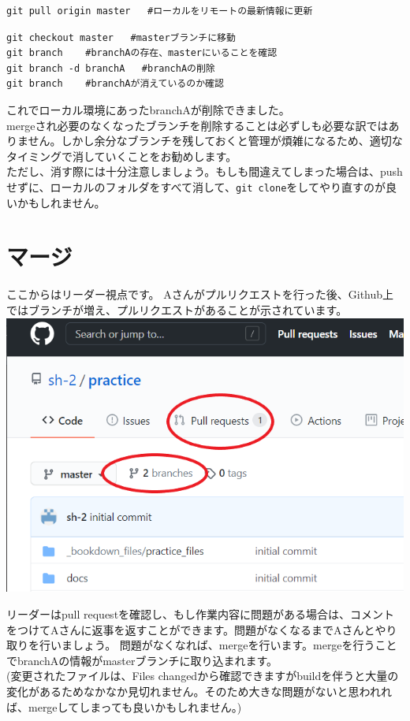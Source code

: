 \documentclass[
]{book}
\begin{document}
\begin{verbatim}
git pull origin master   #ローカルをリモートの最新情報に更新
\end{verbatim}

\begin{verbatim}
git checkout master   #masterブランチに移動
git branch    #branchAの存在、masterにいることを確認
git branch -d branchA   #branchAの削除
git branch    #branchAが消えているのか確認
\end{verbatim}

これでローカル環境にあったbranchAが削除できました。\\
mergeされ必要のなくなったブランチを削除することは必ずしも必要な訳ではありません。しかし余分なブランチを残しておくと管理が煩雑になるため、適切なタイミングで消していくことをお勧めします。\\
ただし、消す際には十分注意しましょう。もしも間違えてしまった場合は、pushせずに、ローカルのフォルダをすべて消して、\texttt{git\ clone}をしてやり直すのが良いかもしれません。

\hypertarget{ux30deux30fcux30b8}{%
\section{マージ}\label{ux30deux30fcux30b8}}

ここからはリーダー視点です。
Aさんがプルリクエストを行った後、Github上ではブランチが増え、プルリクエストがあることが示されています。
\includegraphics{pics/branch01.png}

リーダーはpull requestを確認し、もし作業内容に問題がある場合は、コメントをつけてAさんに返事を返すことができます。問題がなくなるまでAさんとやり取りを行いましょう。
問題がなくなれば、mergeを行います。mergeを行うことでbranchAの情報がmasterブランチに取り込まれます。\\
(変更されたファイルは、Files changedから確認できますがbuildを伴うと大量の変化があるためなかなか見切れません。そのため大きな問題がないと思われれば、mergeしてしまっても良いかもしれません。)　　
\end{document}

